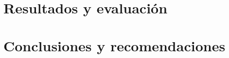 \documentclass[12pt]{MIA-USA}
\begin{document}
    \chapter{Resultados y evaluaci\'on}
    \label{cap:resultados}
    
    
    \chapter{Conclusiones y recomendaciones}
    \label{cap:conclusiones}
    
    
    
    \appendix
    
    
    
    
 	
\end{document}
